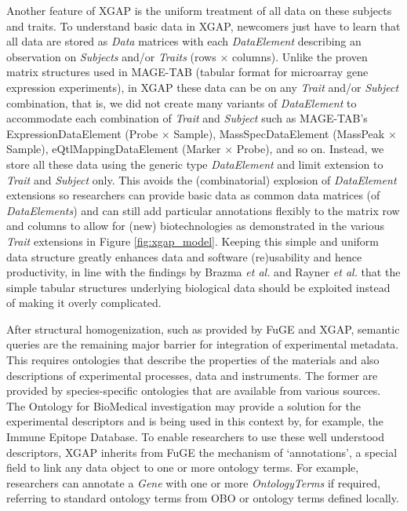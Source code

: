 Another feature of XGAP is the uniform treatment of all data on these subjects and traits.
To understand basic data in XGAP, newcomers just have to learn that all data are stored as \textsl{Data} matrices with each \textsl{DataElement} describing an observation on \textsl{Subjects} and/or \textsl{Traits} (rows $\times$ columns).
Unlike the proven matrix structures used in MAGE-TAB (tabular format for microarray gene expression experiments)\cite{Rayner_2006}, in XGAP these data can be on any \textsl{Trait} and/or \textsl{Subject} combination, that is, we did not create many variants of \textsl{DataElement} to accommodate each combination of \textsl{Trait} and \textsl{Subject} such as MAGE-TAB’s ExpressionDataElement (Probe $\times$ Sample), MassSpecDataElement (MassPeak $\times$ Sample), eQtlMappingDataElement (Marker $\times$ Probe), and so on.
Instead, we store all these data using the generic type \textsl{DataElement} and limit extension to \textsl{Trait} and \textsl{Subject} only.
This avoids the (combinatorial) explosion of \textsl{DataElement} extensions so researchers can provide basic data as common data matrices (of \textsl{DataElements}) and can still add particular annotations flexibly to the matrix row and columns to allow for (new) biotechnologies as demonstrated in the various \textsl{Trait} extensions in Figure \ref{fig:xgap_model}.
Keeping this simple and uniform data structure greatly enhances data and software (re)usability and hence productivity, in line with the findings by Brazma \textsl{et al.}\cite{Brazma_2006} and Rayner \textsl{et al.}\cite{Rayner_2006} that the simple tabular structures underlying biological data should be exploited instead of making it overly complicated.

After structural homogenization, such as provided by FuGE and XGAP, semantic queries are the remaining major barrier for integration of experimental metadata.
This requires ontologies that describe the properties of the materials and also descriptions of experimental processes, data and instruments.
The former are provided by species-specific ontologies that are available from various sources.
The Ontology for BioMedical investigation\cite{xgap_pubchem} may provide a solution for the experimental descriptors and is being used in this context by, for example, the Immune Epitope Database\cite{Peters_2005}.
To enable researchers to use these well understood descriptors, XGAP inherits from FuGE the mechanism of ‘annotations’, a special field to link any data object to one or more ontology terms.
For example, researchers can annotate a \textsl{Gene} with one or more \textsl{OntologyTerms} if required, referring to standard ontology terms from OBO\cite{Smith_2007} or ontology terms defined locally.

